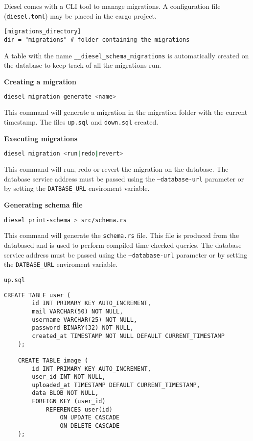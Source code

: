 \documentclass[../documentation.tex]{subfiles}
\begin{document}
Diesel comes with a CLI tool to manage migrations.
A configuration file (\texttt{diesel.toml}) may be placed in the cargo project.

\begin{lstlisting}
[migrations_directory]
dir = "migrations" # folder containing the migrations
\end{lstlisting}

A table with the name \texttt{\_\_diesel\_schema\_migrations}
is automatically created on the database to keep track of all the migrations
run.


\textbf{Creating a migration}
\begin{lstlisting}[language=bash]
    diesel migration generate <name>
\end{lstlisting}
This command will generate a migration in the migration folder with the current timestamp.
The files \texttt{up.sql} and \texttt{down.sql} created.

\textbf{Executing migrations}
\begin{lstlisting}[language=bash]
    diesel migration <run|redo|revert>
\end{lstlisting}
This command will run, redo or revert the migration on the database.
The database service address must be passed using
the \texttt{--database-url} parameter or by setting the \texttt{DATBASE\_URL}
enviroment variable.

\textbf{Generating schema file}
\begin{lstlisting}[language=bash]
    diesel print-schema > src/schema.rs
\end{lstlisting}
This command will generate the \texttt{schema.rs} file.
This file is produced from the databased and is used to
perform compiled-time checked queries.
The database service address must be passed using
the \texttt{--database-url} parameter or by setting the \texttt{DATBASE\_URL}
enviroment variable.

\texttt{up.sql}
\begin{lstlisting}[style=sql]
    CREATE TABLE user (
        id INT PRIMARY KEY AUTO_INCREMENT,
        mail VARCHAR(50) NOT NULL,
        username VARCHAR(25) NOT NULL,
        password BINARY(32) NOT NULL,
        created_at TIMESTAMP NOT NULL DEFAULT CURRENT_TIMESTAMP
    );
    
    CREATE TABLE image (
        id INT PRIMARY KEY AUTO_INCREMENT,
        user_id INT NOT NULL,
        uploaded_at TIMESTAMP DEFAULT CURRENT_TIMESTAMP,
        data BLOB NOT NULL,
        FOREIGN KEY (user_id)
            REFERENCES user(id)
                ON UPDATE CASCADE
                ON DELETE CASCADE
    );
\end{lstlisting}
\end{document}
